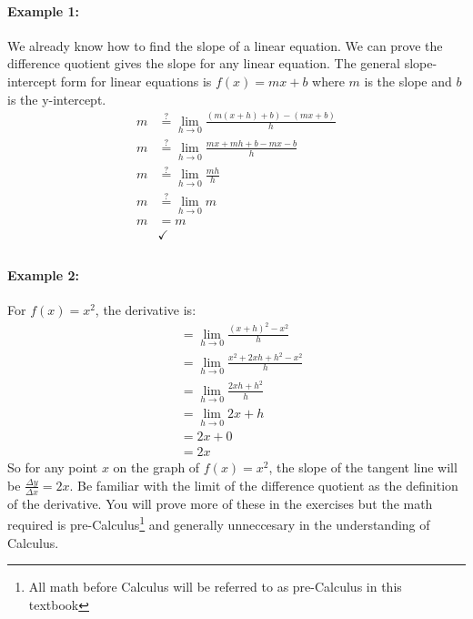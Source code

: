 \documentclass[../revisedmain.tex]{subfiles}
\begin{document}
	\newpage
	\paragraph{Example 1:} We already know how to find the slope of a linear equation. We can prove the difference quotient gives the slope for any linear equation. The general slope-intercept form for linear equations is \(f(x)=mx+b\) where \(m\) is the slope and \(b\) is the y-intercept. 
	\begin{equation}
		\begin{split}
		m&\stackrel{?}{=} \lim_{h\to 0}\frac{(m(x+h)+b)-(mx+b)}{h}\\
		m&\stackrel{?}{=} \lim_{h\to 0}\frac{mx+mh+b-mx-b}{h}\\
		m&\stackrel{?}{=} \lim_{h\to 0}\frac{mh}{h}\\
		m&\stackrel{?}{=} \lim_{h\to 0}m\\
		m&=m\\
		&\checkmark\\
	\end{split}
	\end{equation}
	\paragraph{Example 2:} For $f(x)=x^2$, the derivative is:
	\begin{equation}
	\begin{split}
	&= \lim_{h\to 0} \frac{(x+h)^2-x^2}{h} \\
	&= \lim_{h\to 0} \frac{x^2+2xh+h^2-x^2}{h} \\
	&= \lim_{h\to 0} \frac{2xh+h^2}{h} \\
	&= \lim_{h\to 0} 2x+h \\
	&= 2x+0 \\
	&= 2x
	\end{split}
	\end{equation}
	So for any point $x$ on the graph of $f(x)=x^2$, the slope of the tangent line will be $\frac{\Delta y}{\Delta x}=2x$. Be familiar with the limit of the difference quotient as the definition of the derivative. You will prove more of these in the exercises but the math required is pre-Calculus\footnote{All math before Calculus will be referred to as pre-Calculus in this textbook} and generally unneccesary in the understanding of Calculus.\\
\end{document}
